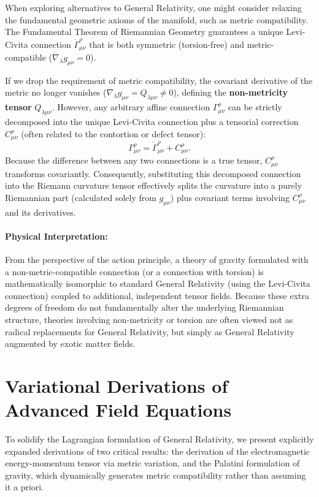 \documentclass[11pt, a4paper]{report}
\begin{document}
When exploring alternatives to General Relativity, one might consider relaxing the fundamental geometric axioms of the manifold, such as metric compatibility. The Fundamental Theorem of Riemannian Geometry guarantees a unique Levi-Civita connection $\mathring{\Gamma}^{\rho}_{\mu\nu}$ that is both symmetric (torsion-free) and metric-compatible ($\mathring{\nabla}_{\lambda}g_{\mu\nu} = 0$). 

If we drop the requirement of metric compatibility, the covariant derivative of the metric no longer vanishes ($\nabla_{\lambda}g_{\mu\nu} = Q_{\lambda\mu\nu} \neq 0$), defining the \textbf{non-metricity tensor} $Q_{\lambda\mu\nu}$. However, any arbitrary affine connection $\Gamma^{\rho}_{\mu\nu}$ can be strictly decomposed into the unique Levi-Civita connection plus a tensorial correction $C^{\rho}_{\mu\nu}$ (often related to the contortion or defect tensor):
\begin{equation}
\Gamma^{\rho}_{\mu\nu} = \mathring{\Gamma}^{\rho}_{\mu\nu} + C^{\rho}_{\mu\nu}.
\end{equation}
Because the difference between any two connections is a true tensor, $C^{\rho}_{\mu\nu}$ transforms covariantly. Consequently, substituting this decomposed connection into the Riemann curvature tensor effectively splits the curvature into a purely Riemannian part (calculated solely from $g_{\mu\nu}$) plus covariant terms involving $C^{\rho}_{\mu\nu}$ and its derivatives. 

\paragraph{Physical Interpretation:} From the perspective of the action principle, a theory of gravity formulated with a non-metric-compatible connection (or a connection with torsion) is mathematically isomorphic to standard General Relativity (using the Levi-Civita connection) coupled to additional, independent tensor fields. Because these extra degrees of freedom do not fundamentally alter the underlying Riemannian structure, theories involving non-metricity or torsion are often viewed not as radical replacements for General Relativity, but simply as General Relativity augmented by exotic matter fields. 

\section{Variational Derivations of Advanced Field Equations}

To solidify the Lagrangian formulation of General Relativity, we present explicitly expanded derivations of two critical results: the derivation of the electromagnetic energy-momentum tensor via metric variation, and the Palatini formulation of gravity, which dynamically generates metric compatibility rather than assuming it a priori.
\end{document}
